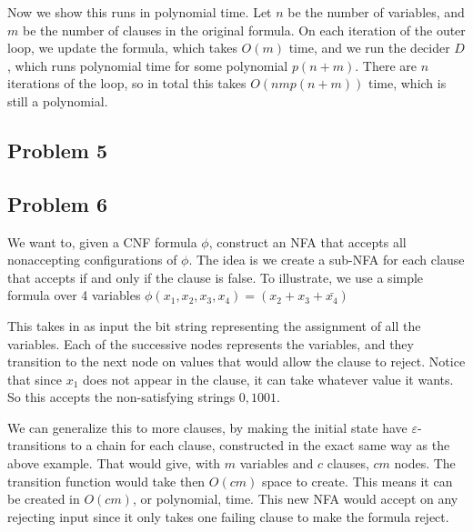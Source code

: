 \documentclass[english]{article}
\begin{document}
Now we show this runs in polynomial time. Let $n$ be the number of variables, and $m$ be the number of clauses in the
original formula. On each iteration of the outer loop, we update the formula, which takes $O(m)$ time, and we run
the decider $D$, which runs polynomial time for some polynomial $p(n+m)$. There are $n$ iterations of the loop, so in
total this takes $O(nm p(n+m))$ time, which is still a polynomial.

\subsection*{Problem 5}

\subsection*{Problem 6}
We want to, given a CNF formula $\phi$, construct an NFA that accepts all nonaccepting configurations of $\phi$.
The idea is we create a sub-NFA for each clause that accepts if and only if the clause is false. To illustrate,
we use a simple formula over 4 variables $\phi(x_1,x_2,x_3,x_4) = (x_2 + x_3 + \bar{x_4})$


This takes in as input the bit string representing the assignment of all the variables. Each of the successive nodes
represents the variables, and they transition to the next node on values that would allow the clause to reject.
Notice that since $x_1$ does not appear in the clause, it can take whatever value it wants. So this accepts
the non-satisfying strings ${0,1}001$. 

We can generalize this to more clauses, by making the initial state have $\varepsilon$-transitions 
to a chain for each clause, constructed in the exact same way as the above example. That would
give, with $m$ variables and $c$ clauses, $cm$ nodes. The transition function would take then
$O(cm)$ space to create. This means it can be created in $O(cm)$, or polynomial, time.
This new NFA would accept on any rejecting input since it only takes one failing clause to make the formula
reject. 
\end{document}
